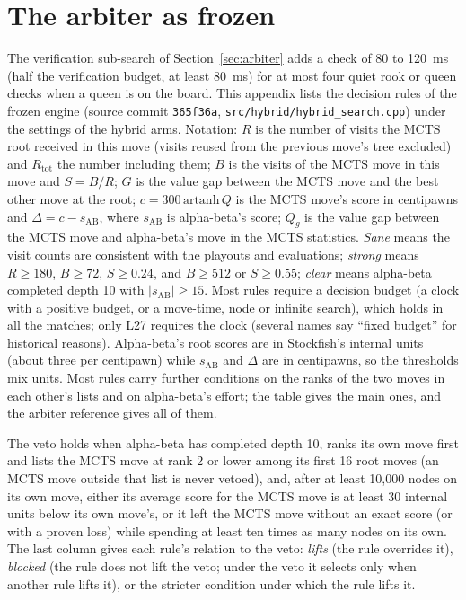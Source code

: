 \documentclass{article}
\begin{document}
\section{The arbiter as frozen}
\label{app:ladder}
The verification sub-search of Section~\ref{sec:arbiter} adds a check of 80 to 120~ms (half the verification budget, at least 80~ms) for at most four quiet rook or queen checks when a queen is on the board. This appendix lists the decision rules of the frozen engine (source commit \texttt{365f36a}, \texttt{src/hybrid/hybrid\_search.cpp}) under the settings of the hybrid arms. Notation: $R$ is the number of visits the MCTS root received in this move (visits reused from the previous move's tree excluded) and $R_{\mathrm{tot}}$ the number including them; $B$ is the visits of the MCTS move in this move and $S=B/R$; $G$ is the value gap between the MCTS move and the best other move at the root; $c=300\,\mathrm{artanh}\,Q$ is the MCTS move's score in centipawns and $\Delta=c-s_{\mathrm{AB}}$, where $s_{\mathrm{AB}}$ is alpha-beta's score; $Q_g$ is the value gap between the MCTS move and alpha-beta's move in the MCTS statistics. \emph{Sane} means the visit counts are consistent with the playouts and evaluations; \emph{strong} means $R\ge 180$, $B\ge 72$, $S\ge 0.24$, and $B\ge 512$ or $S\ge 0.55$; \emph{clear} means alpha-beta completed depth 10 with $|s_{\mathrm{AB}}|\ge 15$. Most rules require a decision budget (a clock with a positive budget, or a move-time, node or infinite search), which holds in all the matches; only L27 requires the clock (several names say ``fixed budget'' for historical reasons). Alpha-beta's root scores are in Stockfish's internal units (about three per centipawn) while $s_{\mathrm{AB}}$ and $\Delta$ are in centipawns, so the thresholds mix units. Most rules carry further conditions on the ranks of the two moves in each other's lists and on alpha-beta's effort; the table gives the main ones, and the arbiter reference gives all of them.

The veto holds when alpha-beta has completed depth 10, ranks its own move first and lists the MCTS move at rank 2 or lower among its first 16 root moves (an MCTS move outside that list is never vetoed), and, after at least 10{,}000 nodes on its own move, either its average score for the MCTS move is at least 30 internal units below its own move's, or it left the MCTS move without an exact score (or with a proven loss) while spending at least ten times as many nodes on its own. The last column gives each rule's relation to the veto: \emph{lifts} (the rule overrides it), \emph{blocked} (the rule does not lift the veto; under the veto it selects only when another rule lifts it), or the stricter condition under which the rule lifts it.
\end{document}
